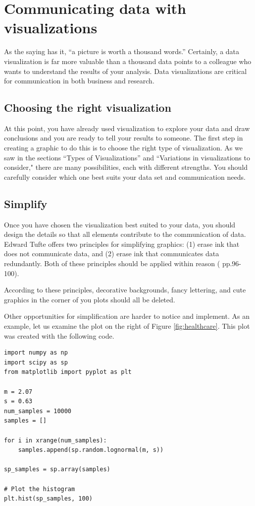 \section*{Communicating data with visualizations}

As the saying has it, ``a picture is worth a thousand words.'' 
Certainly, a data visualization is far more valuable than a thousand data points to a colleague who wants to understand the results of your analysis. 
Data visualizations are critical for communication in both business and research.

\subsection*{Choosing the right visualization}
At this point, you have already used visualization to explore your data and draw conclusions and you are ready to tell your results to someone. 
The first step in creating a graphic to do this is to choose the right type of visualization. 
As we saw in the sections ``Types of Visualizations'' and ``Variations in visualizations to consider," there are many possibilities, each with different strengths. 
You should carefully consider which one best suits your data set and communication needs.

\subsection*{Simplify}
Once you have chosen the visualization best suited to your data, you should design the details so that all elements contribute to the communication of data. 
Edward Tufte offers two principles for simplifying graphics: (1) erase ink that does not communicate data, and (2) erase ink that communicates data redundantly. 
Both of these principles should be applied within reason (\cite{tufte2001} pp.96-100). 

According to these principles, decorative backgrounds, fancy lettering, and cute graphics in the corner of you plots should all be deleted.

Other opportunities for simplification are harder to notice and implement. As an example, let us examine the plot on the right of Figure \ref{fig:healthcare}. 
This plot was created with the following code.

\begin{lstlisting}
import numpy as np
import scipy as sp
from matplotlib import pyplot as plt

m = 2.07
s = 0.63
num_samples = 10000
samples = []

for i in xrange(num_samples):
    samples.append(sp.random.lognormal(m, s)) 

sp_samples = sp.array(samples)

# Plot the histogram
plt.hist(sp_samples, 100)
\end{lstlisting}

